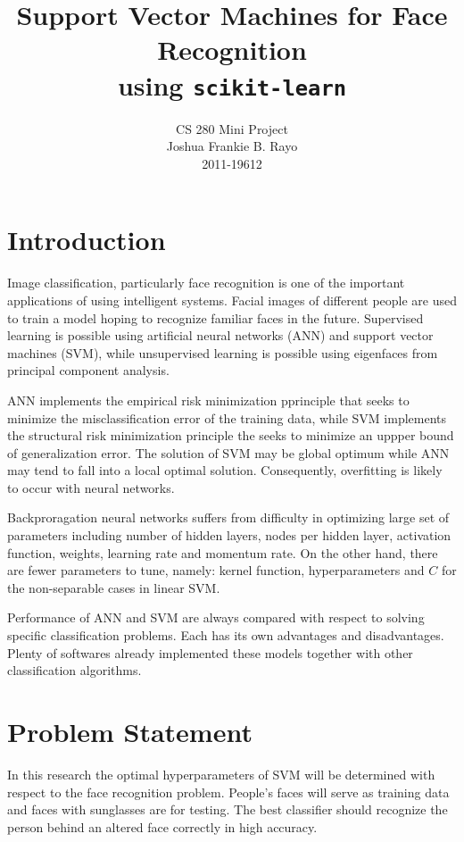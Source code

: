 \documentclass[11pt,a4paper]{article}
\begin{document}
	\title{Support Vector Machines for Face Recognition \\ using \texttt{scikit-learn}}
	\author{CS 280 Mini Project\\Joshua Frankie B. Rayo\\2011-19612}
	\maketitle
	\tableofcontents
	\listoffigures
	\lstlistoflistings
	
	\section{Introduction}
	Image classification, particularly face recognition is one of the important applications of using intelligent systems. Facial images of different people are used to train a model hoping to recognize familiar faces in the future. Supervised learning is possible using artificial neural networks (ANN) and support vector machines (SVM), while unsupervised learning is possible using eigenfaces from principal component analysis.
	
	ANN implements the empirical risk minimization pprinciple that seeks to minimize the misclassification error of the training data, while SVM implements the structural risk minimization principle the seeks to minimize an uppper bound of generalization error. The solution of SVM may be global optimum while ANN may tend to fall into a local optimal solution. Consequently, overfitting is likely to occur with neural networks. \cite{bib:fin}
	
	Backproragation neural networks suffers from difficulty in optimizing large set of parameters including number of hidden layers, nodes per hidden layer, activation function, weights, learning rate and momentum rate. \cite{bib:fin} On the other hand, there are fewer parameters to tune, namely: kernel function, hyperparameters and $C$ for the non-separable cases in linear SVM. \cite{bib:cred}
	
	Performance of ANN and SVM are always compared with respect to solving specific classification problems. Each has its own advantages and disadvantages. Plenty of softwares already implemented these models together with other classification algorithms.
	
	\section{Problem Statement}
	In this research the optimal hyperparameters of SVM will be determined with respect to the face recognition problem. People's faces will serve as training data and faces with sunglasses are for testing. The best classifier should recognize the person behind an altered face correctly in high accuracy.
	
\end{document}

